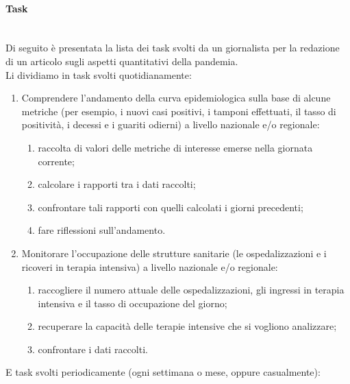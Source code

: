\paragraph{Task}\mbox{}\\
Di seguito è presentata la lista dei task svolti da un giornalista per la redazione di un articolo sugli aspetti quantitativi della pandemia.\\
Li dividiamo in task svolti quotidianamente:
\begin{enumerate}
    \item Comprendere l'andamento della curva epidemiologica sulla base di alcune metriche (per esempio, i nuovi casi positivi, i tamponi effettuati, il tasso di positività, i decessi e i guariti odierni) a livello nazionale e/o regionale:
    \begin{enumerate}[label=\alph*.]
        \item raccolta di valori delle metriche di interesse emerse nella giornata corrente;
        \item calcolare i rapporti tra i dati raccolti;
        \item confrontare tali rapporti con quelli calcolati i giorni precedenti;
        \item fare riflessioni sull'andamento.
    \end{enumerate}
    \item Monitorare l'occupazione delle strutture sanitarie (le ospedalizzazioni e i ricoveri in terapia intensiva) a livello nazionale e/o regionale:
    \begin{enumerate}[label=\alph*.]
        \item raccogliere il numero attuale delle ospedalizzazioni, gli ingressi in terapia intensiva e il tasso di occupazione del giorno;
        \item recuperare la capacità delle terapie intensive che si vogliono analizzare;
        \item confrontare i dati raccolti.
    \end{enumerate}
\end{enumerate}
E task svolti periodicamente (ogni settimana o mese, oppure casualmente):
